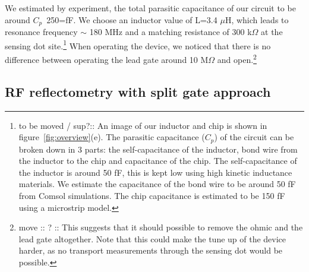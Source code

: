 \documentclass{article}
\begin{document}
\\ \\ 
We estimated by experiment, the total parasitic capacitance of our circuit to be around $C_p$~250=fF. We choose an inductor value of L=3.4 $\mu$H, which leads to resonance frequency $\sim$ 180 MHz and a matching resistance of 300 k$\Omega$ at the sensing dot site.\footnote{ to be moved / sup?:: 
An image of our inductor and chip is shown in figure\ \ref{fig:overview}(e). The parasitic capacitance ($C_p$)  of the circuit can be broken down in 3 parts: the self-capacitance of the inductor, bond wire from the inductor to the chip and capacitance of the chip. The self-capacitance of the inductor is around 50 fF, this is kept low using high kinetic inductance materials. We estimate the capacitance of the bond wire to be around 50 fF from Comsol simulations. The chip capacitance is estimated to be 150 fF using a microstrip model.
}
When operating the device, we noticed that there is no difference between operating the lead gate around 10 M$\Omega$ and open.\footnote{ move :: ? :: This  suggests that it should possible to remove the ohmic and the lead gate altogether. Note that this could make the tune up of the device harder, as no transport measurements through the sensing dot would be possible.}

\subsection{RF reflectometry with split gate approach}
\end{document}
